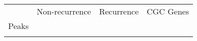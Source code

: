 \begin{tabular}{lccr}
\toprule
{} & Non-recurrence & Recurrence & CGC Genes \\
Peaks &                &            &           \\
\midrule
      &                &            &           \\
\bottomrule
\end{tabular}
